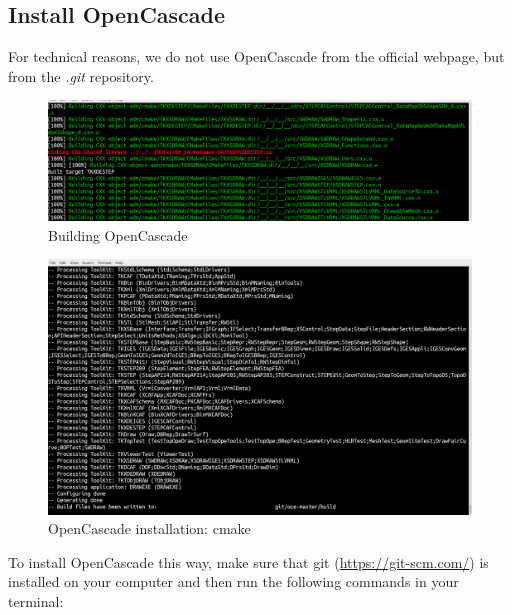 \documentclass[
12pt, %
a4paper, %
oneside, %
headinclude,footinclude, %
BCOR5mm, %
]{scrartcl}
\begin{document}
\subsection{Install OpenCascade}
For technical reasons, we do not use OpenCascade from the official webpage, but from the \textit{.git} repository. 
\begin{figure}
\centering
\includegraphics[scale=0.3]{img/OC_Build5_cut.png}
\caption{Building OpenCascade}
\label{fig:OC_build}
\end{figure}
\begin{figure}
\centering
\includegraphics[scale=0.3]{img/OC_CMake2.png}
\caption{OpenCascade installation: cmake}
\label{fig:OC_cmake}
\end{figure}
To install OpenCascade this way, make sure that git (\href{https://git-scm.com/}{https://git-scm.com/}) is installed on your computer and then run the following commands in your terminal:
\end{document}
